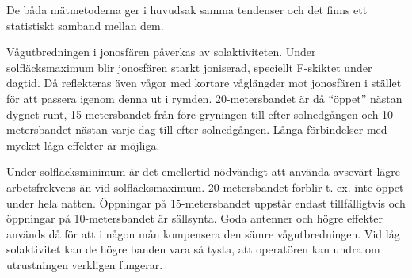 De båda mätmetoderna ger i huvudsak samma tendenser och det finns ett
statistiskt samband mellan dem.

Vågutbredningen i jonosfären påverkas av solaktiviteten. Under
solfläcksmaximum blir jonosfären starkt joniserad, speciellt F-skiktet
under dagtid. Då reflekteras även vågor med kortare våglängder mot
jonosfären i stället för att passera igenom denna ut i
rymden. 20-metersbandet är då ``öppet'' nästan dygnet runt,
15-metersbandet från före gryningen till efter solnedgången och
10-metersbandet nästan varje dag till efter solnedgången. Långa
förbindelser med mycket låga effekter är möjliga.

Under solfläcksminimum är det emellertid nödvändigt att använda
avsevärt lägre arbetsfrekvens än vid solfläcksmaximum.
20-metersbandet förblir t. ex. inte öppet under hela natten. Öppningar
på 15-metersbandet uppstår endast tillfälligtvis och öppningar på
10-metersbandet är sällsynta.  Goda antenner och högre effekter
används då för att i någon mån kompensera den sämre
vågutbredningen. Vid låg solaktivitet kan de högre banden vara så
tysta, att operatören kan undra om utrustningen verkligen fungerar.
